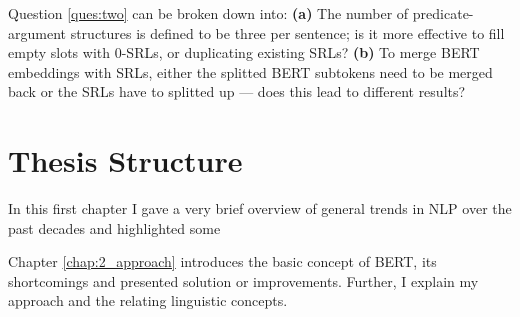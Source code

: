 Question \ref{ques:two} can be broken down into: \textbf{(a)} The number of predicate-argument
structures is defined to be three per sentence; is it more effective to fill empty slots with
0-SRLs, or duplicating existing SRLs? \textbf{(b)} To merge BERT embeddings with SRLs, either
the splitted BERT subtokens need to be merged back or the SRLs have to splitted up --- does
this lead to different results?









\section{Thesis Structure}

In this first chapter I gave a very brief overview of general trends in
NLP over the past decades and highlighted some

Chapter \ref{chap:2_approach} introduces the basic concept of BERT,
its {\color{red} shortcomings} and presented solution or improvements. Further,
I explain my approach and the relating linguistic concepts.

